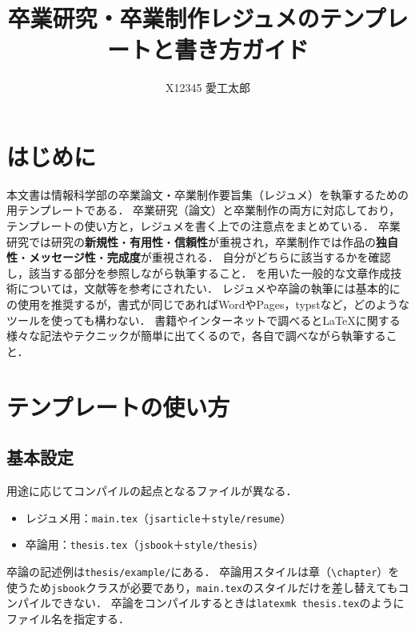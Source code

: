 
\title{卒業研究・卒業制作レジュメのテンプレートと書き方ガイド} %
\subtitle{} %

\author{%
    X12345 愛工太郎%
}



\maketitle

\section{はじめに}
\label{sec:intro}
本文書は情報科学部の卒業論文・卒業制作要旨集（レジュメ）を執筆するための\upLaTeX 用テンプレートである．
卒業研究（論文）と卒業制作の両方に対応しており，テンプレートの使い方と，レジュメを書く上での注意点をまとめている．
卒業研究では研究の\textbf{新規性}・\textbf{有用性}・\textbf{信頼性}が重視され，卒業制作では作品の\textbf{独自性}・\textbf{メッセージ性}・\textbf{完成度}が重視される．
自分がどちらに該当するかを確認し，該当する部分を参照しながら執筆すること．
\upLaTeX を用いた一般的な文章作成技術については，文献\cite{tex}等を参考にされたい．
レジュメや卒論の執筆には基本的に\upLaTeX の使用を推奨するが，書式が同じであればWordやPages，typstなど，どのようなツールを使っても構わない．
書籍やインターネットで調べると\LaTeX に関する様々な記法やテクニックが簡単に出てくるので，各自で調べながら執筆すること．

\section{テンプレートの使い方}
\label{sec:usage}

\subsection{基本設定}
\label{subsec:basic}
用途に応じてコンパイルの起点となるファイルが異なる．
\begin{itemize}
    \item レジュメ用：\texttt{main.tex}（\texttt{jsarticle}＋\texttt{style/resume}）
    \item 卒論用：\texttt{thesis.tex}（\texttt{jsbook}＋\texttt{style/thesis}）
\end{itemize}
卒論の記述例は\texttt{thesis/example/}にある．
卒論用スタイルは章（\verb|\chapter|）を使うため\texttt{jsbook}クラスが必要であり，\texttt{main.tex}のスタイルだけを差し替えてもコンパイルできない．
卒論をコンパイルするときは\texttt{latexmk thesis.tex}のようにファイル名を指定する．

